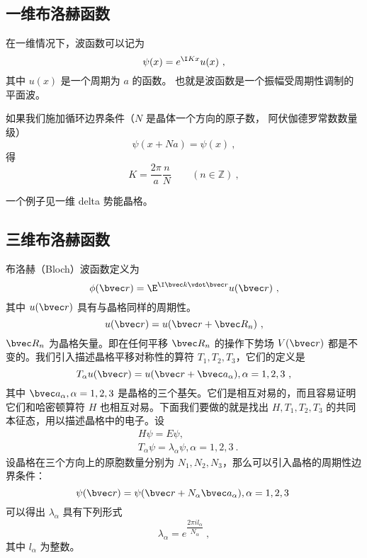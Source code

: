 
\subsection{一维布洛赫函数}
在一维情况下，波函数可以记为
\begin{equation}
\psi(x) = e^{\I K x} u(x)~,
\end{equation}
其中 $u(x)$ 是一个周期为 $a$ 的函数。 也就是波函数是一个振幅受周期性调制的平面波。

如果我们施加循环边界条件（$N$ 是晶体一个方向的原子数， 阿伏伽德罗常数数量级）
\begin{equation}
\psi(x+Na) = \psi(x)~,
\end{equation}
得
\begin{equation}
K = \frac{2\pi}{a} \frac{n}{N} \qquad (n \in \mathbb Z)~,
\end{equation}

一个例子见一维 delta 势能晶格。

\subsection{三维布洛赫函数}

\cite{黄昆}\cite{Bransden}布洛赫（Bloch）波函数定义为
\begin{equation}\label{eq_Bloch_3}
\phi(\bvec r) = \E^{\I \bvec k \vdot \bvec r} u(\bvec r)~,
\end{equation}
其中 $u(\bvec r)$ 具有与晶格同样的周期性。
\begin{equation}
u(\bvec r)=u(\bvec r+\bvec R_n)~,
\end{equation}
$\bvec R_n$ 为晶格矢量。即在任何平移 $\bvec R_n$ 的操作下势场 $V(\bvec r)$ 都是不变的。我们引入描述晶格平移对称性的算符 $T_1,T_2,T_3$，它们的定义是
\begin{equation}
T_\alpha u(\bvec r)= u(\bvec r+\bvec a_\alpha),\alpha=1,2,3~,
\end{equation}
其中 $\bvec a_\alpha,\alpha=1,2,3$ 是晶格的三个基矢。它们是相互对易的，而且容易证明它们和哈密顿算符 $H$ 也相互对易。下面我们要做的就是找出 $H,T_1,T_2,T_3$ 的共同本征态，用以描述晶格中的电子。设
\begin{equation}
\begin{aligned}
&H\psi=E\psi,\\
&T_\alpha \psi = \lambda_\alpha \psi, \alpha=1,2,3~.
\end{aligned}
\end{equation}
设晶格在三个方向上的原胞数量分别为 $N_1,N_2,N_3$，那么可以引入晶格的周期性边界条件：
\begin{equation}
\psi(\bvec r)=\psi(\bvec r+N_\alpha \bvec a_\alpha),\alpha=1,2,3~
\end{equation}
可以得出 $\lambda_\alpha$ 具有下列形式
\begin{equation}
\lambda_\alpha=e^{ \dfrac{2\pi i l_\alpha}{N_\alpha}}~,
\end{equation}
其中 $l_\alpha$ 为整数。


